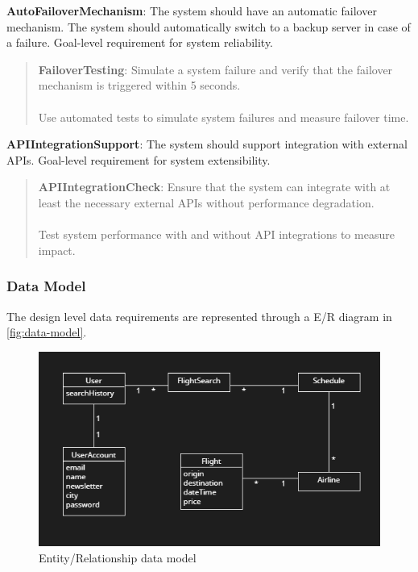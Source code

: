 \textbf{AutoFailoverMechanism}: The system should have an automatic failover mechanism. The system should automatically switch to a backup server in case of a failure. Goal-level requirement for system reliability.
\begin{quote}
    \textbf{FailoverTesting}: Simulate a system failure and verify that the failover mechanism is triggered within 5 seconds. \\ \\
    Use automated tests to simulate system failures and measure failover time.
\end{quote}
\textbf{APIIntegrationSupport}: The system should support integration with external APIs. Goal-level requirement for system extensibility.
\begin{quote}
    \textbf{APIIntegrationCheck}: Ensure that the system can integrate with at least the necessary external APIs without performance degradation. \\ \\
    Test system performance with and without API integrations to measure impact.
\end{quote}

\subsubsection{Data Model}
The design level data requirements are represented through a E/R diagram in \autoref{fig:data-model}.

\begin{figure}[H]
    \includegraphics[width=1\textwidth]{resources/dataRelations.PNG}
    \caption{Entity/Relationship data model}
    \label{fig:data-model}
\end{figure}

